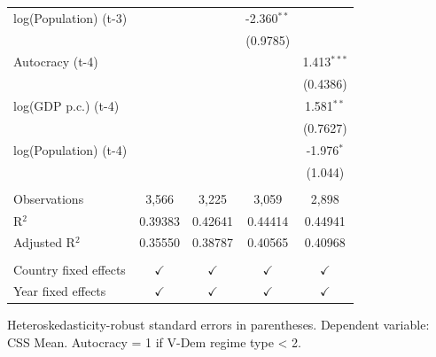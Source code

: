 \begin{table}[htbp]
\begin{tabular}{lcccc}
      log(Population) (t-3) &                &                & -2.360$^{**}$ &   \\   
                            &                &                & (0.9785)      &   \\   
      Autocracy (t-4)       &                &                &               & 1.413$^{***}$\\   
                            &                &                &               & (0.4386)\\   
      log(GDP p.c.) (t-4)   &                &                &               & 1.581$^{**}$\\   
                            &                &                &               & (0.7627)\\   
      log(Population) (t-4) &                &                &               & -1.976$^{*}$\\   
                            &                &                &               & (1.044)\\   
       \\
      Observations          & 3,566          & 3,225          & 3,059         & 2,898\\  
      R$^2$                 & 0.39383        & 0.42641        & 0.44414       & 0.44941\\  
      Adjusted R$^2$        & 0.35550        & 0.38787        & 0.40565       & 0.40968\\  
       \\
      Country fixed effects & $\checkmark$   & $\checkmark$   & $\checkmark$  & $\checkmark$\\   
      Year fixed effects    & $\checkmark$   & $\checkmark$   & $\checkmark$  & $\checkmark$\\   
      \bottomrule
   \end{tabular}
   
   \par \raggedright 
   Heteroskedasticity-robust standard errors in parentheses. Dependent variable: CSS Mean. Autocracy = 1 if V-Dem regime type < 2.
\end{table}


